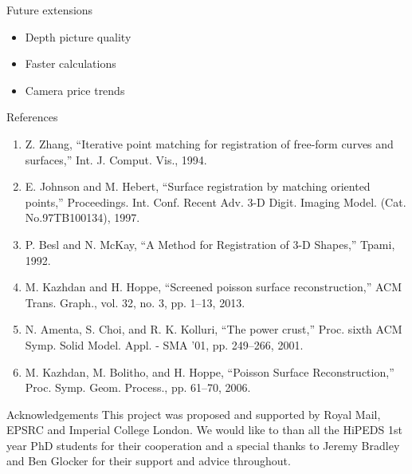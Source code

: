\documentclass{beamer}
\begin{document}
\begin{frame}{Future extensions}

\begin{itemize}
	\item Depth picture quality
	\item Faster calculations
	\item Camera price trends
\end{itemize}
\end{frame}





\begin{frame}{References}
\begin{enumerate}
	\item Z. Zhang, “Iterative point matching for registration of free-form curves and surfaces,” Int. J. Comput. Vis., 1994.
	\item E. Johnson and M. Hebert, “Surface registration by matching oriented points,” Proceedings. Int. Conf. Recent Adv. 3-D Digit. Imaging Model. (Cat. No.97TB100134), 1997.
	\item  P. Besl and N. McKay, “A Method for Registration of 3-D Shapes,” Tpami, 1992.
	\item M. Kazhdan and H. Hoppe, “Screened poisson surface reconstruction,” ACM Trans. Graph., vol. 32, no. 3, pp. 1–13, 2013.
	\item N. Amenta, S. Choi, and R. K. Kolluri, “The power crust,” Proc. sixth ACM Symp. Solid Model. Appl. - SMA ’01, pp. 249–266, 2001.
	\item M. Kazhdan, M. Bolitho, and H. Hoppe, “Poisson Surface Reconstruction,” Proc. Symp. Geom. Process., pp. 61–70, 2006.
\end{enumerate}
\end{frame}





\begin{frame}{Acknowledgements}
This project was proposed and supported by Royal Mail, EPSRC and Imperial College London. We would like to than all the HiPEDS 1st year PhD students for their cooperation and a special thanks to Jeremy Bradley and Ben Glocker for their support and advice throughout.
\end{frame}

\end{document}
